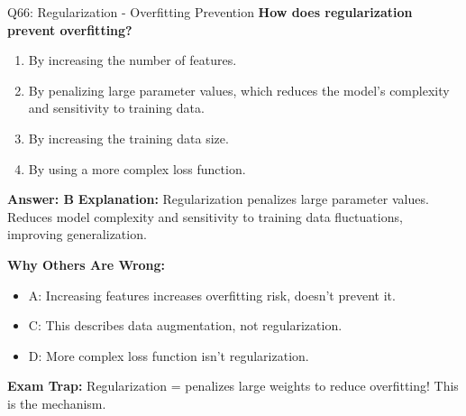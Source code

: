 \documentclass[8pt]{beamer}
\begin{document}
	\begin{frame}{Q66: Regularization - Overfitting Prevention}
		\fontsize{6.5}{7.5}\selectfont
		\textbf{How does regularization prevent overfitting?}
		
		\begin{enumerate}
			\item By increasing the number of features.
			\item By penalizing large parameter values, which reduces the model's complexity and sensitivity to training data.
			\item By increasing the training data size.
			\item By using a more complex loss function.
		\end{enumerate}
		
		\vspace{0.05cm}
		\textcolor{myblue}{\textbf{Answer: B}}
		\vspace{0.05cm}
		\textcolor{myblue}{\textbf{Explanation:}} Regularization penalizes large parameter values. Reduces model complexity and sensitivity to training data fluctuations, improving generalization.
		
		\vspace{0.05cm}
		\textcolor{myred}{\textbf{Why Others Are Wrong:}}
		\begin{itemize}
			\item \textcolor{myred}{A:} Increasing features increases overfitting risk, doesn't prevent it.
			\item \textcolor{myred}{C:} This describes data augmentation, not regularization.
			\item \textcolor{myred}{D:} More complex loss function isn't regularization.
		\end{itemize}
		
		\textcolor{myred}{\textbf{Exam Trap:}} Regularization = \textcolor{myblue}{penalizes large weights} to reduce overfitting! This is the mechanism.
	\end{frame}
	
\end{document}
